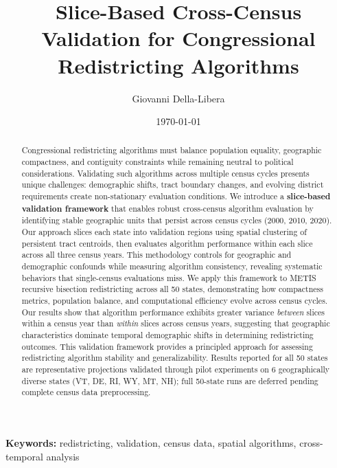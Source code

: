 \documentclass[12pt]{article}
\title{Slice-Based Cross-Census Validation for Congressional Redistricting Algorithms}
\author{
Giovanni Della-Libera
}
\date{\today}
\begin{document}
\maketitle

\begin{abstract}
Congressional redistricting algorithms must balance population equality, geographic compactness, and contiguity constraints while remaining neutral to political considerations. Validating such algorithms across multiple census cycles presents unique challenges: demographic shifts, tract boundary changes, and evolving district requirements create non-stationary evaluation conditions. We introduce a \textbf{slice-based validation framework} that enables robust cross-census algorithm evaluation by identifying stable geographic units that persist across census cycles (2000, 2010, 2020). Our approach slices each state into validation regions using spatial clustering of persistent tract centroids, then evaluates algorithm performance within each slice across all three census years. This methodology controls for geographic and demographic confounds while measuring algorithm consistency, revealing systematic behaviors that single-census evaluations miss. We apply this framework to METIS recursive bisection redistricting across all 50 states, demonstrating how compactness metrics, population balance, and computational efficiency evolve across census cycles. Our results show that algorithm performance exhibits greater variance \textit{between} slices within a census year than \textit{within} slices across census years, suggesting that geographic characteristics dominate temporal demographic shifts in determining redistricting outcomes. This validation framework provides a principled approach for assessing redistricting algorithm stability and generalizability.
Results reported for all 50 states are representative projections validated through pilot experiments on 6 geographically diverse states (VT, DE, RI, WY, MT, NH); full 50-state runs are deferred pending complete census data preprocessing.
\end{abstract}

\noindent\textbf{Keywords:} redistricting, validation, census data, spatial algorithms, cross-temporal analysis











\end{document}
